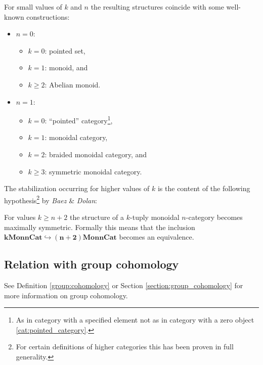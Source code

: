     \begin{example}
        For small values of $k$ and $n$ the resulting structures coincide with some well-known constructions:
        \begin{itemize}
            \item $n=0$:
                \begin{itemize}
                    \item $k=0$: pointed set,
                    \item $k=1$: monoid, and
                    \item $k\geq2$: Abelian monoid.
                \end{itemize}
            \item $n=1$:
                \begin{itemize}
                    \item $k=0$: ``pointed'' category\footnote{As in category with a specified element not as in category with a zero object \ref{cat:pointed_category}.},
                    \item $k=1$: monoidal category,
                    \item $k=2$: braided monoidal category, and
                    \item $k\geq3$: symmetric monoidal category.
                \end{itemize}
        \end{itemize}
    \end{example}
    The stabilization occurring for higher values of $k$ is the content of the following hypothesis\footnote{For certain definitions of higher categories this has been proven in full generality.} by \textit{Baez} \& \textit{Dolan}:
    \begin{theorem}
        For values $k\geq n+2$ the structure of a $k$-tuply monoidal $n$-category becomes maximally symmetric. Formally this means that the inclusion \emph{$\boldsymbol{k}\mathbf{Mon}\boldsymbol{n}\mathbf{Cat}\hookrightarrow\boldsymbol{(n+2)}\mathbf{Mon}\boldsymbol{n}\mathbf{Cat}$} becomes an equivalence.
    \end{theorem}

\subsection{Relation with group cohomology}\label{section:hda_group_cohomology}

    See Definition \ref{group:cohomology} or Section \ref{section:group_cohomology} for more information on group cohomology.

